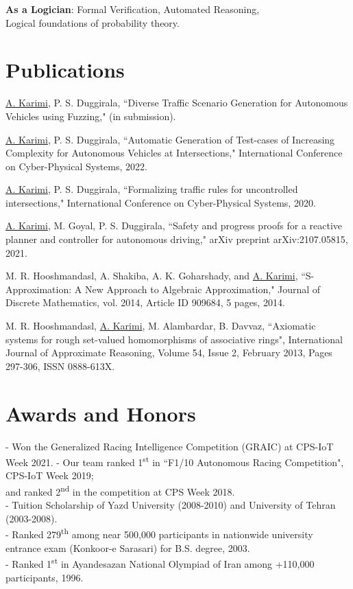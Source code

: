 \documentclass[margin]{res}
\begin{document}
\begin{resume}
\textbf{As a Logician}:
Formal Verification, Automated Reasoning, \\
Logical foundations of probability theory.



\newpage
\section{Publications}
\underline{A. Karimi}, P. S. Duggirala, ``Diverse Traffic Scenario Generation for Autonomous Vehicles using Fuzzing," (in submission).

\underline{A. Karimi}, P. S. Duggirala, ``Automatic Generation of Test-cases of Increasing Complexity for Autonomous Vehicles at Intersections,"
International Conference on Cyber-Physical Systems, 2022.

\underline{A. Karimi}, P. S. Duggirala, ``Formalizing traffic rules for uncontrolled intersections,"
International Conference on Cyber-Physical Systems, 2020.

\underline{A. Karimi}, M. Goyal, P. S. Duggirala, ``Safety and progress proofs for a reactive planner and controller for autonomous driving," arXiv preprint arXiv:2107.05815, 2021.

M. R. Hooshmandasl, A. Shakiba, A. K. Goharshady, and \underline{A. Karimi}, ``S-Approximation: A New Approach to Algebraic Approximation," Journal of Discrete Mathematics, vol. 2014, Article ID 909684, 5 pages, 2014.

M. R. Hooshmandasl, \underline{A. Karimi}, M. Alambardar, B. Davvaz, ``Axiomatic systems for rough set-valued homomorphisms of associative rings", International Journal of Approximate Reasoning, Volume 54, Issue 2, February 2013, Pages 297-306, ISSN 0888-613X.


\section{Awards and Honors}
- Won the Generalized Racing Intelligence Competition (GRAIC) at CPS-IoT Week 2021.
- Our team ranked 1\textsuperscript{st} in ``F1/10 Autonomous Racing Competition", CPS-IoT Week 2019;\\
and ranked 2\textsuperscript{nd} in the competition at CPS Week 2018.\\
- Tuition Scholarship of Yazd University (2008-2010) and University of Tehran (2003-2008). \\
- Ranked 279\textsuperscript{th} among near 500,000 participants in nationwide university entrance exam (Konkoor-e Sarasari) for B.S. degree, 2003. \\
- Ranked 1\textsuperscript{st} in Ayandesazan National Olympiad of Iran among +110,000 participants, 1996.


\end{resume}
\end{document}
